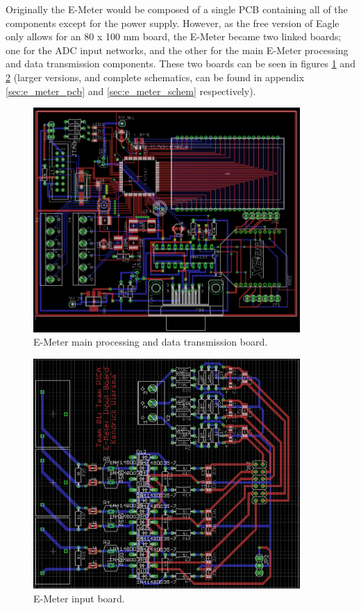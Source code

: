 Originally the E-Meter would be composed of a single \ac{PCB} containing all of the components except for the power supply. However, as the free version of Eagle only allows for an 80 x 100 mm board, the E-Meter became two linked boards; one for the \ac{ADC} input networks, and the other for the main E-Meter processing and data transmission components. These two boards can be seen in figures \ref{fig:e_meter_main_board} and \ref{fig:e_meter_input_board} (larger versions, and complete schematics, can be found in appendix \ref{sec:e_meter_pcb} and \ref{sec:e_meter_schem} respectively).
\begin{figure}[htbp]
  \centering
  \includegraphics[width=4in]{includes/e_meter_main_board}
  \caption{E-Meter main processing and data transmission board.}
  \label{fig:e_meter_main_board}
\end{figure}
\begin{figure}[htbp]
  \centering
  \includegraphics[width=4in]{includes/e_meter_input_board}
  \caption{E-Meter input board.}
  \label{fig:e_meter_input_board}
\end{figure}

